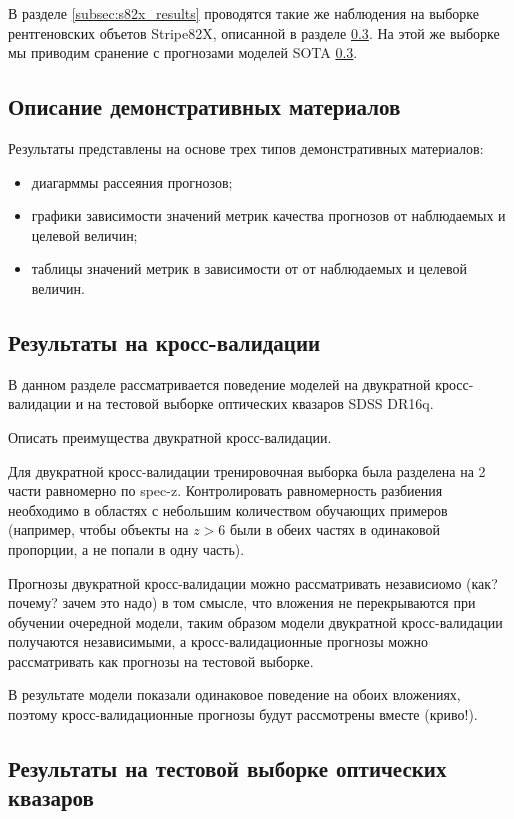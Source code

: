 \documentclass[fleqn,usenatbib]{mnras}
\begin{document}
В разделе \ref{subsec:s82x_results} проводятся такие же наблюдения на выборке рентгеновских объетов Stripe82X, описанной в разделе \ref{}. На этой же выборке мы приводим сранение с прогнозами моделей SOTA \ref{}.

\subsection{Описание демонстративных материалов}
Результаты представлены на основе трех типов демонстративных материалов:
\begin{itemize}
    \item диагарммы рассеяния прогнозов;
    \item графики зависимости значений метрик качества прогнозов от наблюдаемых и целевой величин;
    \item таблицы значений метрик в зависимости от от наблюдаемых и целевой величин.
\end{itemize}

\subsection{Результаты на кросс-валидации}
В данном разделе рассматривается поведение моделей на двукратной кросс-валидации и на тестовой выборке оптических квазаров SDSS DR16q.

Описать преимущества двукратной кросс-валидации.

Для двукратной кросс-валидации тренировочная выборка была разделена на 2 части равномерно по spec-z. Контролировать равномерность разбиения необходимо в областях с небольшим количеством обучающих примеров (например, чтобы объекты на $z > 6$ были в обеих частях в одинаковой пропорции, а не попали в одну часть).

Прогнозы двукратной кросс-валидации можно рассматривать независиомо (как? почему? зачем это надо) в том смысле, что вложения не перекрываются при обучении очередной модели, таким образом модели двукратной кросс-валидации получаются независимыми, а кросс-валидационные прогнозы можно рассматривать как прогнозы на тестовой выборке.

В результате модели показали одинаковое поведение на обоих вложениях, поэтому кросс-валидационные прогнозы будут рассмотрены вместе (криво!).

\subsection{Результаты на тестовой выборке оптических квазаров}
\end{document}
